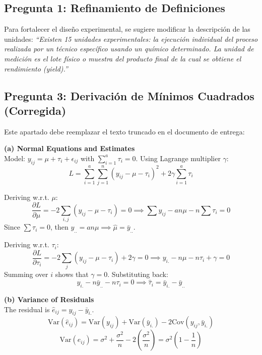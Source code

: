 \documentclass[11pt,a4paper]{article}
\begin{document}
\subsection{Pregunta 1: Refinamiento de Definiciones}
Para fortalecer el dise\~no experimental, se sugiere modificar la descripci\'on de las unidades:
\textit{``Existen 15 unidades experimentales: la ejecuci\'on individual del proceso realizada por un t\'ecnico espec\'ifico usando un qu\'imico determinado. La unidad de medici\'on es el lote f\'isico o muestra del producto final de la cual se obtiene el rendimiento (yield).''}

\subsection{Pregunta 3: Derivaci\'on de M\'inimos Cuadrados (Corregida)}
Este apartado debe reemplazar el texto truncado en el documento de entrega:

\textbf{(a) Normal Equations and Estimates} \\
Model: $y_{ij} = \mu + \tau_i + \epsilon_{ij}$ with $\sum_{i=1}^a \tau_i = 0$. Using Lagrange multiplier $\gamma$:
\[
L = \sum_{i=1}^a \sum_{j=1}^n (y_{ij} - \mu - \tau_i)^2 + 2\gamma \sum_{i=1}^a \tau_i
\]

Deriving w.r.t. $\mu$:
\[
\frac{\partial L}{\partial \mu} = -2 \sum_{i,j} (y_{ij} - \mu - \tau_i) = 0 \implies \sum y_{ij} - an\mu - n\sum \tau_i = 0
\]
Since $\sum \tau_i = 0$, then $y_{..} = an\mu \implies \hat{\mu} = \bar{y}_{..}$.

Deriving w.r.t. $\tau_i$:
\[
\frac{\partial L}{\partial \tau_i} = -2 \sum_{j} (y_{ij} - \mu - \tau_i) + 2\gamma = 0 \implies y_{i.} - n\mu - n\tau_i + \gamma = 0
\]
Summing over $i$ shows that $\gamma = 0$. Substituting back:
\[
y_{i.} - n\bar{y}_{..} - n\tau_i = 0 \implies \hat{\tau}_i = \bar{y}_{i.} - \bar{y}_{..}
\]

\textbf{(b) Variance of Residuals} \\
The residual is $\hat{e}_{ij} = y_{ij} - \bar{y}_{i.}$.
\[
\text{Var}(\hat{e}_{ij}) = \text{Var}(y_{ij}) + \text{Var}(\bar{y}_{i.}) - 2\text{Cov}(y_{ij}, \bar{y}_{i.})
\]
\[
\text{Var}(\hat{e}_{ij}) = \sigma^2 + \frac{\sigma^2}{n} - 2\left(\frac{\sigma^2}{n}\right) = \sigma^2 \left( 1 - \frac{1}{n} \right)
\]
\end{document}

